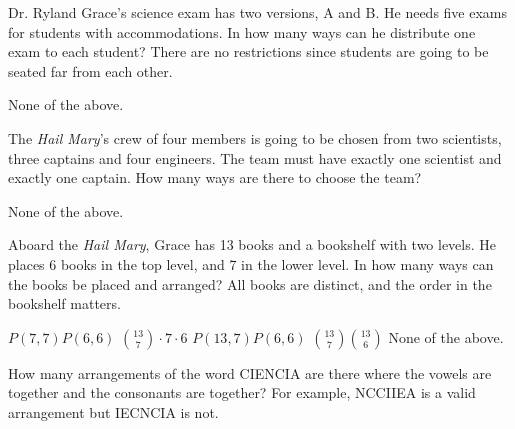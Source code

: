 \documentclass[11pt,addpoints]{exam}
\begin{document}
\begin{questions}


\question[5] Dr. Ryland Grace's science exam has two versions, A and B. He needs five exams for students with accommodations. In how many ways can he distribute one exam to each student? There are no restrictions since students are going to be seated far from each other.


    \begin{choices}
    \choice None of the above.
\end{choices}



\question[5] The \textit{Hail Mary}'s crew of four members is going to be chosen from two scientists, three captains and four engineers. The team must have exactly one scientist and exactly one captain. How many ways are there to choose the team?


    \begin{choices}
    \choice None of the above.
\end{choices}



\newpage

\question[5] Aboard the \textit{Hail Mary}, Grace has 13 books and a bookshelf with two levels. He places 6 books in the top level, and 7 in the lower level. In how many ways can the books be placed and arranged? All books are distinct, and the order in the bookshelf matters.

\begin{choices}
    \choice $P(7,7) P(6,6)$
    \choice ${13\choose 7} \cdot 7 \cdot 6$ 
    \choice $P(13,7) P(6,6)$%
    \choice ${13\choose 7}{13\choose 6}$
    \choice None of the above.
\end{choices}



\question[5]  How many arrangements of the word CIENCIA are there where the vowels are together and the consonants are together? For example, \textsc{NCCIIEA} is a valid arrangement but  \textsc{IECNCIA} is not.


\end{questions}
\end{document}
